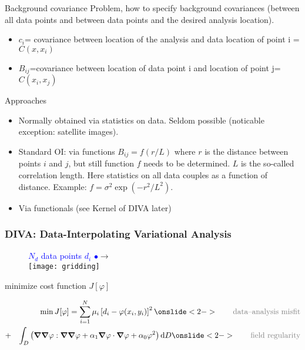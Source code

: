 \begin{frame}{Background covariance}
Problem, how to specify background covariances (between all data points and between data points and the desired analysis location).
\begin{itemize}
\item $c_i$= {covariance between location of the analysis and data location of point i} = $C(x,x_i)$
\item $B_{ij}$={covariance between location of data point i and  location of point j}= $C(x_i,x_j)$
\end{itemize}
Approaches
\begin{itemize}
\item
Normally obtained via statistics on data. Seldom possible (noticable exception: satellite images).
\item
Standard OI: via functions $B_{ij}= f(r/L)$ where $r$ is the distance between points $i$ and $j$, but still function $f$ needs to be determined. $L$ is the so-called correlation length. Here statistics on all data couples as a function of distance.
Example: $f=\sigma^2 \exp(-r^2/L^2)$.
\item Via functionals (see Kernel of DIVA later)
\end{itemize}
\end{frame}

\begin{frame}[t]
\frametitle{DIVA: Data-Interpolating Variational Analysis}
\footnotesize

\begin{figure}[H]
\textcolor{blue}{$N_{d}$ data points $d_{i}$ $\bullet$}\quad $\rightarrow$ \quad{\textcolor{gray}{gridded field}}\\
\centering
\texttt{[image: gridding]}
\end{figure}

 minimize cost function $J[\varphi]$


\begin{eqnarray*} \label{eqn:divaJ}
& &\min {J}[\varphi] = \sum_{i=1}^{N}\mu_i \left[d_{i}-\varphi(x_{i},y_{i})\right]^{2} \onslide<2->{\qquad\textcolor{gray}{\textrm{data--analysis misfit}}}\\
	  &+& \int_{{D}}\left(
{\nablab}{\nablab}\varphi : {\nablab}{\nablab}\varphi + { \alpha_{1}}
{\nablab}\varphi \cdot {\nablab}\varphi + \alpha_{0} \varphi^{2} \right) \ddiff {D} \onslide<2->{\qquad\textcolor{gray}{\textrm{field regularity}}}
\end{eqnarray*}

\end{frame}


